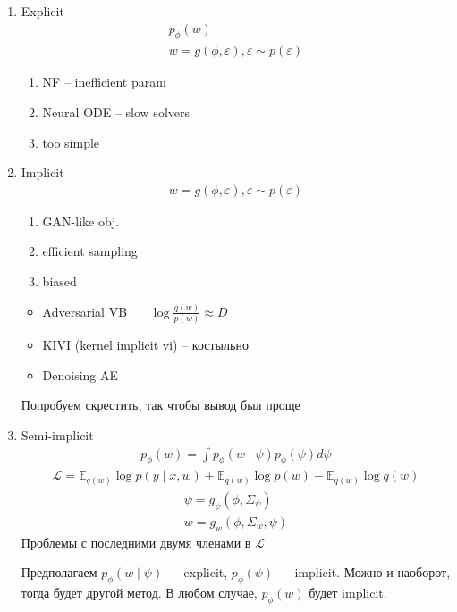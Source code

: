 \documentclass{book}
\begin{document}
\begin{enumerate}
  \item Explicit\\
    \begin{gather*}
      p_\phi(w)\\
      w=g(\phi,\varepsilon), \varepsilon \sim p(\varepsilon)
    \end{gather*}
   \begin{enumerate}
     \item NF -- inefficient param
     \item Neural ODE -- slow solvers
     \item too simple
   \end{enumerate}
 \item Implicit\\
   \begin{gather*}
     w=g(\phi,\varepsilon), \varepsilon \sim p(\varepsilon)
   \end{gather*}
   \begin{enumerate}
     \item GAN-like obj.
     \item efficient sampling
     \item biased
   \end{enumerate}
   \begin{itemize}
     \item Adversarial VB~~~ $\log \frac{q(w)}{p(w)} \approx D$
     \item KIVI (kernel implicit vi) -- костыльно
     \item Denoising AE
   \end{itemize}
  Попробуем скрестить, так чтобы вывод был проще
 \item Semi-implicit
   \begin{gather*}
     p_\phi(w)=\int {p_\phi(w\mid \psi)p_\phi(\psi)d\psi}
   \end{gather*}
   \begin{gather*}
     \mathcal{L}=\mathbb{E}_{q(w)}\log p(y\mid x, w)+\mathbb{E}_{q(w)}\log p(w)-\mathbb{E}_{q(w)}\log q(w)
   \end{gather*}
   \begin{gather*}
     \psi = g_\psi(\phi, \Sigma_\psi)\\
     w=g_w(\phi, \Sigma_w, \psi)
   \end{gather*}
   Проблемы с последними двумя членами в $\mathcal{L}$

   Предполагаем $p_\phi(w\mid \psi)$ --- explicit,  $p_\phi(\psi)$ --- implicit.
   Можно и наоборот, тогда будет другой метод.
   В любом случае, $p_\phi(w)$ будет implicit.


\end{enumerate}
\end{document}
